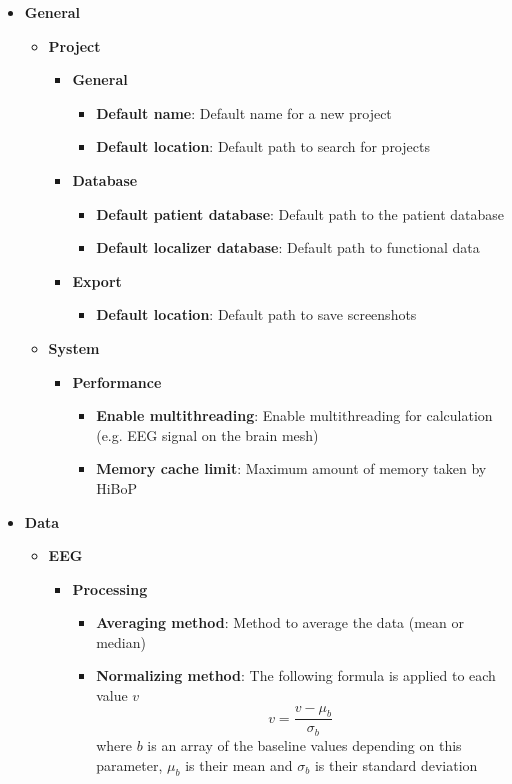 \documentclass[a4paper]{article}
\begin{document}
\begin{itemize}
\item \textbf{General}
\begin{itemize}
\item \textbf{Project}
\begin{itemize}
\item \textbf{General}
\begin{itemize}
\item \textbf{Default name}: Default name for a new project
\item \textbf{Default location}: Default path to search for projects
\end{itemize}
\item \textbf{Database}
\begin{itemize}
\item \textbf{Default patient database}: Default path to the patient database
\item \textbf{Default localizer database}: Default path to functional data
\end{itemize}
\item \textbf{Export}
\begin{itemize}
\item \textbf{Default location}: Default path to save screenshots
\end{itemize}
\end{itemize}
\item \textbf{System}
\begin{itemize}
\item \textbf{Performance}
\begin{itemize}
\item \textbf{Enable multithreading}: Enable multithreading for calculation (e.g. EEG signal on the brain mesh)
\item \textbf{Memory cache limit}: Maximum amount of memory taken by HiBoP
\end{itemize}
\end{itemize}
\end{itemize}
\item \textbf{Data}
\begin{itemize}
\item \textbf{EEG}
\begin{itemize}
\item \textbf{Processing}
\begin{itemize}
\item \textbf{Averaging method}: Method to average the data (mean or median)
\item \textbf{Normalizing method}: The following formula is applied to each value $v$ $$v = \frac{v - \mu_{b}}{\sigma_{b}}$$ where $b$ is an array of the baseline values depending on this parameter, $\mu_b$ is their mean and $\sigma_b$ is their standard deviation

\end{itemize}
\end{itemize}
\end{itemize}
\end{itemize}
\end{document}
